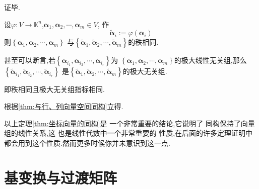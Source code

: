 \begin{formal}
\begin{Proof}
证毕.
\end{Proof}
\end{formal}
\begin{formal}
\begin{theorem}[坐标向量的同构]\label{thm:坐标向量的同构}
    设$\varphi :
    V \longrightarrow 
    \mathbb{K}^n$,$\bm{\alpha}_1,\bm{\alpha}_2
    ,\cdots,\bm{\alpha}_m\in V$,
    作
    \[
    \widetilde{\bm{\alpha}}_i:=
    \varphi\left(\bm{\alpha}_i
    \right) 
    \]
    则$\left\{\bm{\alpha}_1,\bm{\alpha}_2
    ,\cdots,\bm{\alpha}_m
    \right\}$
    与$\left\{\widetilde{\bm{\alpha}
    }_1,\widetilde{\bm{\alpha}}_2,\cdots,\widetilde{
        \bm{\alpha}
    }_m  \right\}$的秩相同.

    甚至可以断言,若$\left\{
        \bm{\alpha}_{i_1},
        \bm{\alpha}_{i_2},
        \cdots
        ,\bm{\alpha}_{i_r}
    \right\}$为
    $\left\{\bm{\alpha}_1,\bm{\alpha}_2
    ,\cdots,\bm{\alpha}_m
    \right\}$的极大线性无关组,那么
    $\left\{\widetilde{\bm
    {\alpha}
    }_{i_1},
    \widetilde{\bm{\alpha}}_{i_2},
    \cdots,\widetilde{
        \bm{\alpha}
    }_{i_r}  \right\}$
    是$\left\{\widetilde{\bm{\alpha}
    }_1,
    \widetilde{\bm{\alpha}}_2,
    \cdots,\widetilde{
        \bm{\alpha}
    }_m \right\}$的极大无关组.

    即秩相同且极大无关组指标相同.
\end{theorem}
\begin{Proof}
根据\cref{thm:与行、列向量空间同构}立得.
\end{Proof}
\end{formal}
\begin{red}
\begin{remark}
    以上定理\cref{thm:坐标向量的同构}是
    一个非常重要的结论,它说明了
    同构保持了向量组的线性关系,这
    也是线性代数中一个非常重要的
    性质,在后面的许多定理证明中
    都会用到这个性质.然而更多时候你并未意识到这一点.
\end{remark}
\end{red}
\newpage
\section{基变换与过渡矩阵}
